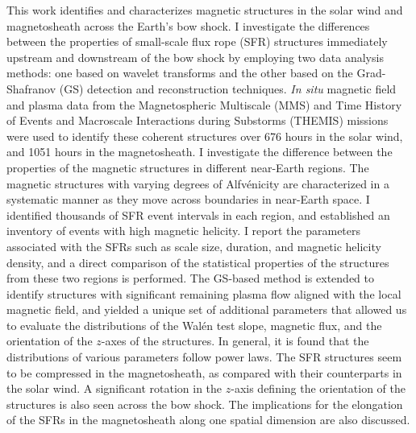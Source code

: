 
This work identifies and characterizes magnetic structures in the solar wind and magnetosheath across the Earth's bow shock. I investigate the differences between the properties of small-scale flux rope (SFR) structures immediately upstream and downstream of the bow shock by employing two data analysis methods: one based on wavelet transforms and the other based on the Grad-Shafranov (GS) detection and reconstruction techniques. \textit{In situ} magnetic field and plasma data from the Magnetospheric Multiscale (MMS) and Time History of Events and Macroscale Interactions during Substorms (THEMIS) missions were used to identify these coherent structures over 676 hours in the solar wind, and 1051 hours in the magnetosheath. I investigate the difference between the properties of the magnetic structures in different near-Earth regions. The magnetic structures with varying degrees of Alfv\'enicity are characterized in a systematic manner as they move across boundaries in near-Earth space. I identified thousands of SFR event intervals in each region, and established an inventory of events with high magnetic helicity. I report the parameters associated with the SFRs such as scale size, duration, and magnetic helicity density, and a direct comparison of the statistical properties of the structures from these two regions is performed. The GS-based method is extended to identify structures with significant remaining plasma flow aligned with the local magnetic field, and yielded a unique set of additional parameters that allowed us to evaluate the distributions of the Wal\'en test slope, magnetic flux, and the orientation of the $z$-axes of the structures. In general, it is found that the distributions of various parameters follow power laws. The SFR structures seem to be compressed in the magnetosheath, as compared with their counterparts in the solar wind. A significant rotation in the $z$-axis defining the orientation of the structures is also seen across the bow shock. The implications for the elongation of the SFRs in the magnetosheath along one spatial dimension are also discussed. 

\clearpage

